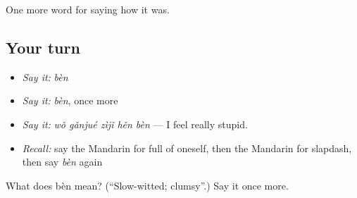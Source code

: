 \begin{grammarlens}[title={What you've built}]
One more word for saying how it was.
\end{grammarlens}

\subsection*{Your turn}
\begin{itemize}
\raggedright
  \item \emph{Say it:} \emph{bèn}
  \item \emph{Say it:} \emph{bèn}, once more
  \item \emph{Say it:} \emph{wǒ gǎnjué zìjǐ hěn bèn} — I feel really stupid.
  \item \emph{Recall:} say the Mandarin for full of oneself, then the Mandarin for slapdash, then say \emph{bèn} again
\end{itemize}

\begin{tcolorbox}[breakable,colback=teal!4,colframe=teal!35!black,title={Before you move on}]
What does bèn mean? (\textquotedblleft{}Slow-witted; clumsy\textquotedblright{}.) Say it once more.
\end{tcolorbox}
